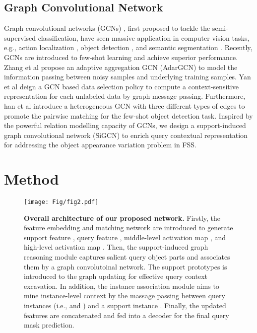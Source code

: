\documentclass{bmvc2k}
\begin{document}
\subsection{Graph Convolutional Network}
Graph convolutional networks (GCNs) \cite{kipf2016semi}, first proposed to tackle the semi-supervised classification, have seen massive application in computer vision tasks, e.g., action localization \cite{nawhal2021activity, zeng2019graph}, object detection \cite{meyer2021graph}, and semantic segmentation \cite{zhang2019dual}. Recently, GCNs are introduced to few-shot learning and achieve superior performance. Zhang et al \cite{zhang2021adargcn} propose an adaptive aggregation GCN (AdarGCN) to model the information passing between noisy samples and underlying training samples. Yan et al \cite{yan2022budget} deign a GCN based data selection policy to compute a context-sensitive representation for each unlabeled data by graph message passing. Furthermore,  han et al \cite{han2021query} introduce a heterogeneous GCN with three different types of edges to promote the pairwise matching for the few-shot object detection task. Inspired by the powerful relation modelling capacity of GCNs, we design a support-induced graph convolutional network (SiGCN) to enrich query contextual representation for addressing the object appearance variation problem in FSS. \section{Method}
\begin{figure*}[!t]
	\centering
	\texttt{[image: Fig/fig2.pdf]}
	\caption{\textbf{Overall architecture of our proposed network.} Firstly, the feature embedding and matching network are introduced to generate support feature , query feature , middle-level activation map , and high-level activation map . Then, the support-induced graph reasoning module captures salient query object parts and associates them by a graph convolutoinal network. The support prototypes  is introduced to the graph updating for effective query context excavation. In addition, the instance association module aims to mine instance-level context by the massage passing between query instances (i.e.,  and ) and a support instance . Finally, the updated features are concatenated and fed into a decoder for the final query mask prediction.}
	\label{fig2}
	\vspace{-4mm}
\end{figure*}
\end{document}
